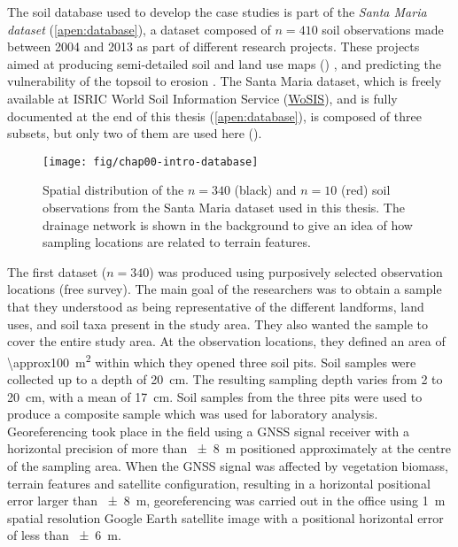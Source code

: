The soil database used to develop the case studies is part of the \emph{Santa Maria dataset} 
(\autoref{apen:database}), a dataset composed of $n = 410$ soil observations made between \num{2004} 
and \num{2013} as part of different research projects. These projects aimed at producing semi-detailed
soil and land use maps ()
\cite{Pedron2005,Miguel2010,SamuelRosaEtAl2011a,MiguelEtAl2012,Samuel-RosaEtAl2013}, and predicting the
vulnerability of the topsoil to erosion \cite{MouraBueno2012,Miguel2013}. The Santa Maria dataset, which is
freely available at ISRIC World Soil Information Service
(\href{http://www.isric.org/data/wosis}{WoSIS}), and is fully documented at the end of this thesis 
(\autoref{apen:database}), is composed of three subsets, but only two of them are used here 
().

\begin{figure}[!ht]
\centering
\texttt{[image: fig/chap00-intro-database]}
\caption{Spatial distribution of the $n = 340$ (black) and $n = 10$ (red) soil observations from 
the Santa Maria dataset used in this thesis. The drainage network is shown in the background to 
give an idea of how sampling locations are related to terrain features.}
\label{fig:intro-database}
\end{figure}

The first dataset ($n = 340$) was produced using purposively selected observation locations (free 
survey). The main goal of the researchers was to obtain a sample that they understood as being 
representative of the different landforms, land uses, and soil taxa present in the study area. They 
also wanted the sample to cover the entire study area. At the observation locations, they defined 
an area of \SI{\approx100}{\metre\squared} within which they opened three soil pits. Soil samples 
were collected up to a depth of \SI{20}{\centi\metre}. The resulting sampling depth varies from 
\num{2} to \SI{20}{\centi\metre}, with a mean of \SI{17}{\centi\metre}. Soil samples from the three 
pits were used to produce a composite sample which was used for laboratory analysis. Georeferencing 
took place in the field using a GNSS signal receiver with a horizontal precision of more than 
\SI{\pm8}{\metre} positioned approximately at the centre of the sampling area. When the GNSS signal 
was affected by vegetation biomass, terrain features and satellite configuration, resulting in a 
horizontal positional error larger than \SI{\pm8}{\metre}, georeferencing was carried out in the 
office using \SI{1}{\metre} spatial resolution Google Earth\textregistered{} satellite image with 
a positional horizontal error of less than \SI{\pm6}{\metre}.

